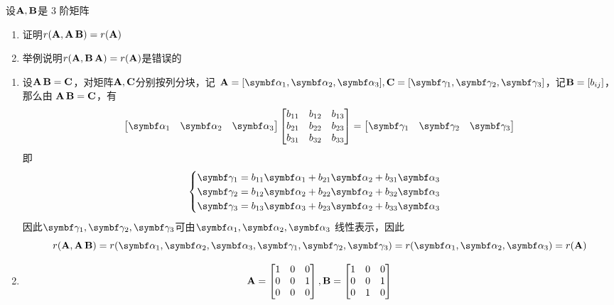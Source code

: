 \documentclass{article}
\begin{document}
\begin{examplle}[]
设\(\operatorname{\textbf{A}},\operatorname{\textbf{B}}\)是 3 阶矩阵
\begin{enumerate}
\item 证明\(r(\operatorname{\textbf{A}},\operatorname{\textbf{A}}\operatorname{\textbf{B}})=r(\operatorname{\textbf{A}})\)
\item 举例说明\(r(\operatorname{\textbf{A}},\operatorname{\textbf{B}}\operatorname{\textbf{A}})=r(\operatorname{\textbf{A}})\)是错误的
\end{enumerate}


\begin{enumerate}
\item 设\(\operatorname{\textbf{A}}\operatorname{\textbf{B}}=\operatorname{\textbf{C}}\)，对矩阵\(\operatorname{\textbf{A}},\operatorname{\textbf{C}}\)分别按列分块，记
\(\bA=[\balpha_1,\balpha_2,\balpha_3],
      \bC=[\bgamma_1,\bgamma_2,\bgamma_3]\)，记\(\operatorname{\textbf{B}}=[b_{ij}]\)，那么由
\(\operatorname{\textbf{A}}\operatorname{\textbf{B}}=\operatorname{\textbf{C}}\)，有
\begin{equation*}
\begin{bmatrix}
\balpha_1&\balpha_2&\balpha_3
\end{bmatrix}
\begin{bmatrix}
b_{11}&b_{12}&b_{13}\\
b_{21}&b_{22}&b_{23}\\
b_{31}&b_{32}&b_{33}\\
\end{bmatrix}=
\begin{bmatrix}
\bgamma_1&\bgamma_2&\bgamma_3
\end{bmatrix}
\end{equation*}
即
\begin{equation*}
\begin{cases}
\bgamma_1=b_{11}\balpha_1+b_{21}\balpha_2+b_{31}\balpha_3\\
\bgamma_2=b_{12}\balpha_2+b_{22}\balpha_2+b_{32}\balpha_3\\
\bgamma_3=b_{13}\balpha_3+b_{23}\balpha_2+b_{33}\balpha_3\\
\end{cases}
\end{equation*}
因此\(\bgamma_1,\bgamma_2,\bgamma_3\)可由\(\balpha_1,\balpha_2,\balpha_3\)
线性表示，因此
\begin{equation*}
r(\bA,\bA\bB)=r(\balpha_1,\balpha_2,\balpha_3,\bgamma_1,\bgamma_2,\bgamma_3)=
r(\balpha_1,\balpha_2,\balpha_3)=r(\bA)
\end{equation*}
\item \begin{equation*}
\operatorname{\textbf{A}}=
\begin{bmatrix}
1&0&0\\0&0&1\\0&0&0
\end{bmatrix},\operatorname{\textbf{B}}=
\begin{bmatrix}
1&0&0\\0&0&1\\0&1&0
\end{bmatrix}
\end{equation*}
\end{enumerate}
\end{examplle}
\end{document}
